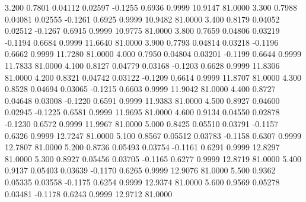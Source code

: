    3.200   0.7801   0.04112   0.02597  -0.1255   0.6936   0.9999  10.9147  81.0000
   3.300   0.7988   0.04081   0.02555  -0.1261   0.6925   0.9999  10.9482  81.0000
   3.400   0.8179   0.04052   0.02512  -0.1267   0.6915   0.9999  10.9775  81.0000
   3.800   0.7659   0.04806   0.03219  -0.1194   0.6684   0.9999  11.6640  81.0000
   3.900   0.7793   0.04814   0.03218  -0.1196   0.6662   0.9999  11.7280  81.0000
   4.000   0.7950   0.04804   0.03201  -0.1199   0.6644   0.9999  11.7833  81.0000
   4.100   0.8127   0.04779   0.03168  -0.1203   0.6628   0.9999  11.8306  81.0000
   4.200   0.8321   0.04742   0.03122  -0.1209   0.6614   0.9999  11.8707  81.0000
   4.300   0.8528   0.04694   0.03065  -0.1215   0.6603   0.9999  11.9042  81.0000
   4.400   0.8727   0.04648   0.03008  -0.1220   0.6591   0.9999  11.9383  81.0000
   4.500   0.8927   0.04600   0.02945  -0.1225   0.6581   0.9999  11.9695  81.0000
   4.600   0.9134   0.04550   0.02878  -0.1230   0.6572   0.9999  11.9967  81.0000
   5.000   0.8425   0.05510   0.03791  -0.1157   0.6326   0.9999  12.7247  81.0000
   5.100   0.8567   0.05512   0.03783  -0.1158   0.6307   0.9999  12.7807  81.0000
   5.200   0.8736   0.05493   0.03754  -0.1161   0.6291   0.9999  12.8297  81.0000
   5.300   0.8927   0.05456   0.03705  -0.1165   0.6277   0.9999  12.8719  81.0000
   5.400   0.9137   0.05403   0.03639  -0.1170   0.6265   0.9999  12.9076  81.0000
   5.500   0.9362   0.05335   0.03558  -0.1175   0.6254   0.9999  12.9374  81.0000
   5.600   0.9569   0.05278   0.03481  -0.1178   0.6243   0.9999  12.9712  81.0000
